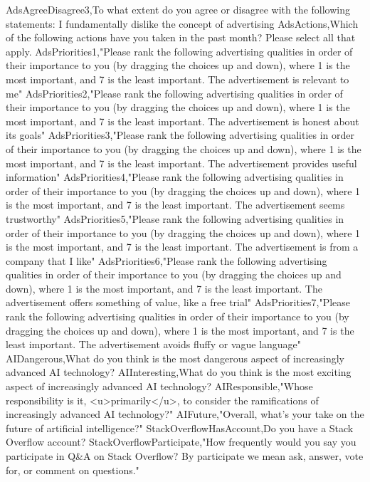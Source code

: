 \begin{appendices}
AdsAgreeDisagree3,To what extent do you agree or disagree with the following statements: I fundamentally dislike the concept of advertising
AdsActions,Which of the following actions have you taken in the past month? Please select all that apply.
AdsPriorities1,"Please rank the following advertising qualities in order of their importance to you (by dragging the choices up and down), where 1 is the most important, and 7 is the least important. The advertisement is relevant to me"
AdsPriorities2,"Please rank the following advertising qualities in order of their importance to you (by dragging the choices up and down), where 1 is the most important, and 7 is the least important. The advertisement is honest about its goals"
AdsPriorities3,"Please rank the following advertising qualities in order of their importance to you (by dragging the choices up and down), where 1 is the most important, and 7 is the least important. The advertisement provides useful information"
AdsPriorities4,"Please rank the following advertising qualities in order of their importance to you (by dragging the choices up and down), where 1 is the most important, and 7 is the least important. The advertisement seems trustworthy"
AdsPriorities5,"Please rank the following advertising qualities in order of their importance to you (by dragging the choices up and down), where 1 is the most important, and 7 is the least important. The advertisement is from a company that I like"
AdsPriorities6,"Please rank the following advertising qualities in order of their importance to you (by dragging the choices up and down), where 1 is the most important, and 7 is the least important. The advertisement offers something of value, like a free trial"
AdsPriorities7,"Please rank the following advertising qualities in order of their importance to you (by dragging the choices up and down), where 1 is the most important, and 7 is the least important. The advertisement avoids fluffy or vague language"
AIDangerous,What do you think is the most dangerous aspect of increasingly advanced AI technology?
AIInteresting,What do you think is the most exciting aspect of increasingly advanced AI technology?
AIResponsible,"Whose responsibility is it, <u>primarily</u>, to consider the ramifications of increasingly advanced AI technology?"
AIFuture,"Overall, what's your take on the future of artificial intelligence?"
StackOverflowHasAccount,Do you have a Stack Overflow account?
StackOverflowParticipate,"How frequently would you say you participate in Q&A on Stack Overflow? By participate we mean ask, answer, vote for, or comment on questions."

\end{appendices}

